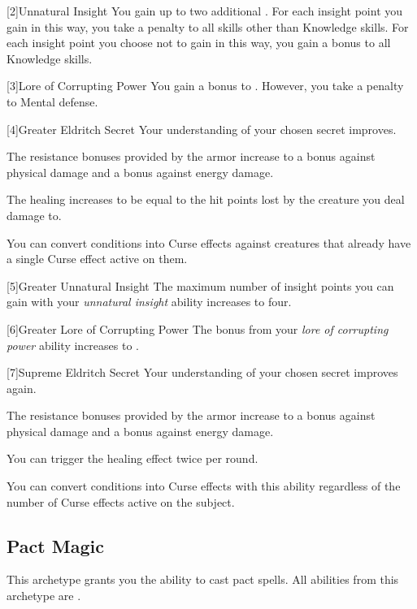         [2]{Unnatural Insight} You gain up to two additional .
        For each insight point you gain in this way, you take a  penalty to all skills other than Knowledge skills.
        For each insight point you choose not to gain in this way, you gain a  bonus to all Knowledge skills.

        [3]{Lore of Corrupting Power} You gain a  bonus to .
        However, you take a  penalty to Mental defense.

        [4]{Greater Eldritch Secret} Your understanding of your chosen secret improves.
        {
             The resistance bonuses provided by the armor increase to a  bonus against physical damage and a  bonus against energy damage.

             The healing increases to be equal to the hit points lost by the creature you deal damage to.

             You can convert conditions into Curse effects against creatures that already have a single Curse effect active on them.
        }

        [5]{Greater Unnatural Insight} The maximum number of insight points you can gain with your \textit{unnatural insight} ability increases to four.

        [6]{Greater Lore of Corrupting Power} The bonus from your \textit{lore of corrupting power} ability increases to .

        [7]{Supreme Eldritch Secret} Your understanding of your chosen secret improves again.
        {
             The resistance bonuses provided by the armor increase to a  bonus against physical damage and a  bonus against energy damage.

             You can trigger the healing effect twice per round.

             You can convert conditions into Curse effects with this ability regardless of the number of Curse effects active on the subject.
        }

    \newpage
    \subsection{Pact Magic}
        This archetype grants you the ability to cast pact spells.
        All abilities from this archetype are .

